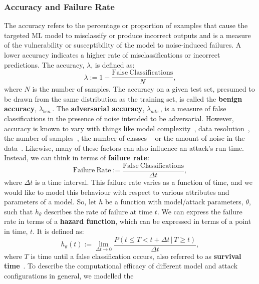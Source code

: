 \subsubsection{Accuracy and Failure Rate}
The accuracy refers to the percentage or proportion of examples that cause the targeted ML model to misclassify or produce incorrect outputs and is a measure of the vulnerability or susceptibility of the model to noise-induced failures. A lower accuracy indicates a higher rate of misclassifications or incorrect predictions. The accuracy, $\lambda$, is defined as:
\begin{equation}
    \lambda := 1 -  \frac{\mathrm{False~Classifications}}{N},
    \label{eq:acc}
\end{equation}
where $N$ is the number of samples. The accuracy on a given test set, presumed to be drawn from the same distribution as the training set, is called the \textbf{benign accuracy}, $\lambda_{ben.}$. The \textbf{adversarial accuracy}, $\lambda_{adv.}$, is a measure of false classifications in the presence of noise intended to be adversarial. However, accuracy is known to vary with things like model complexity~\cite{vgg,resnet}, data resolution~\cite{feature_squeezing}, the number of samples~\cite{vapnik1994measuring}, the number of classes ~\cite{dohmatob_generalized_2019} or the amount of noise in the data~\cite{gauss_aug,gauss_out,dohmatob_generalized_2019}. Likewise, many of these factors can also influence an attack's run time. Instead, we can think in terms of \textbf{failure rate}:
\begin{equation}
    \mathrm{Failure~Rate} := \frac{\mathrm{False~Classifications}}{\Delta t} ,
    \label{eq:failure_rate}
\end{equation}
where $\Delta t$ is a time interval. This failure rate varies as a function of time, and we would like to model this behaviour with respect to various attributes and parameters of a model.
So, let $h$ be a function with model/attack parameters, $\theta$, such that $h_{\theta}$ describes the rate of failure at time $t$.
We can express the failure rate in terms of a \textbf{hazard function}, which can be expressed in terms of a point in time, $t$. It is defined as:
\begin{equation}
    h_{\theta}(t) := \lim_{ \Delta t \rightarrow 0} \frac{P(t \leq T < t + \Delta t \,|\, T \geq t)}{\Delta t},
    \label{eq:failure_rate_h}
\end{equation}
where $T$ is time until a false classification occurs, also referred to as \textbf{survival time}~\cite{kleinbaum1996survival}. To describe the computational efficacy of different model and attack configurations in general, we modelled the
